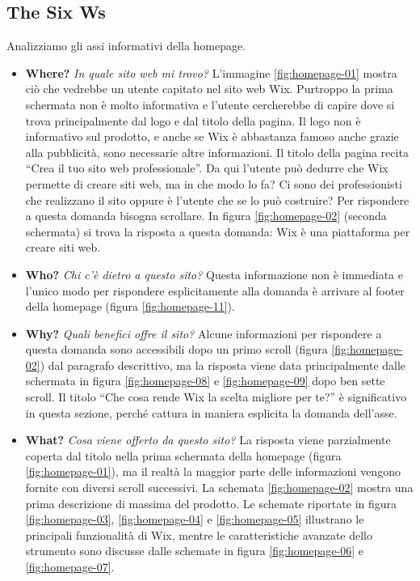 \documentclass[11pt,a4paper]{article}
\newcommand*{\wix}{Wix}
\begin{document}
\subsection{The Six Ws}
\label{subsec:homepage-the-six-ws}

Analizziamo gli assi informativi della homepage.

\begin{itemize}
  \item \textbf{Where?} \textit{In quale sito web mi trovo?}
    L'immagine \ref{fig:homepage-01} mostra ciò che vedrebbe un utente
    capitato nel sito web \wix{}. Purtroppo la prima schermata non è
    molto informativa e l'utente cercherebbe di capire dove si trova
    principalmente dal logo e dal titolo della pagina. Il logo non è
    informativo sul prodotto, e anche se \wix{} è abbastanza famoso
    anche grazie alla pubblicità, sono necessarie altre
    informazioni. Il titolo della pagina recita ``Crea il tuo sito web
    professionale''. Da qui l'utente può dedurre che \wix{}
    permette di creare siti web, ma in che modo lo fa? Ci sono dei
    professionisti che realizzano il sito oppure è l'utente che se lo
    può costruire? Per rispondere a questa domanda bisogna
    scrollare. In figura \ref{fig:homepage-02} (seconda schermata) si
    trova la risposta a questa domanda: \wix{} è una piattaforma per
    creare siti web.

  \item \textbf{Who?} \textit{Chi c'è dietro a questo sito?} Questa
    informazione non è immediata e l'unico modo per rispondere
    esplicitamente alla domanda è arrivare al footer della homepage
    (figura \ref{fig:homepage-11}).

  \item \textbf{Why?} \textit{Quali benefici offre il sito?} Alcune
    informazioni per rispondere a questa domanda sono accessibili dopo
    un primo scroll (figura \ref{fig:homepage-02}) dal paragrafo
    descrittivo, ma la risposta viene data principalmente dalle
    schermata in figura \ref{fig:homepage-08} e \ref{fig:homepage-09}
    dopo ben sette scroll. Il titolo ``Che cosa rende Wix la scelta
    migliore per te?'' è significativo in questa sezione, perché
    cattura in maniera esplicita la domanda dell'asse.

  \item \textbf{What?} \textit{Cosa viene offerto da questo sito?} La
    risposta viene parzialmente coperta dal titolo nella prima
    schermata della homepage (figura \ref{fig:homepage-01}), ma il
    realtà la maggior parte delle informazioni vengono fornite con
    diversi scroll successivi. La schemata \ref{fig:homepage-02}
    mostra una prima descrizione di massima del prodotto. Le schemate
    riportate in figura \ref{fig:homepage-03}, \ref{fig:homepage-04} e
    \ref{fig:homepage-05} illustrano le principali funzionalità di
    \wix{}, mentre le caratteristiche avanzate dello strumento sono
    discusse dalle schemate in figura \ref{fig:homepage-06} e
    \ref{fig:homepage-07}.


\end{itemize}
\end{document}
